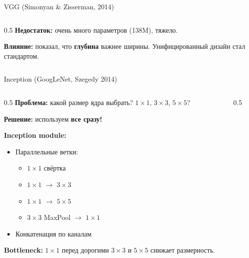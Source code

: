 \documentclass[aspectratio=169, 9pt]{beamer}
\begin{document}
\begin{frame}{VGG (Simonyan \& Zisserman, 2014)}
\begin{columns}[T]
\begin{column}{0.5\textwidth}
      \vspace{0.3em}
      \textbf{Недостаток:} очень много параметров (138M), тяжело.
      
      \vspace{0.3em}
      \textbf{Влияние:} показал, что \textbf{глубина} важнее ширины. Унифицированный дизайн стал стандартом.
    \end{column}
  \end{columns}
\end{frame}

\begin{frame}{Inception (GoogLeNet, Szegedy 2014)}
  \begin{columns}[T]
    \begin{column}{0.5\textwidth}
      \textbf{Проблема:} какой размер ядра выбрать? $1\times1$, $3\times3$, $5\times5$?
      
      \textbf{Решение:} используем \textbf{все сразу!}
      
      \vspace{0.3em}
      \textbf{Inception module:}
      \begin{itemize}
        \item Параллельные ветки:
        \begin{itemize}
          \item $1\times1$ свёртка
          \item $1\times1$ $\to$ $3\times3$
          \item $1\times1$ $\to$ $5\times5$
          \item $3\times3$ MaxPool $\to$ $1\times1$
        \end{itemize}
        \item Конкатенация по каналам
      \end{itemize}
      
      \vspace{0.3em}
      \textbf{Bottleneck:} $1\times1$ перед дорогими $3\times3$ и $5\times5$ снижает размерность.
    \end{column}
    \begin{column}{0.5\textwidth}
      \centering
\end{column}
\end{columns}
\end{frame}
\end{document}
